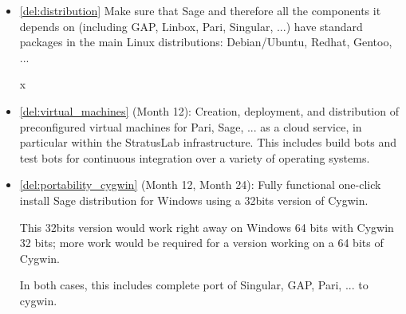 \begin{Workpackage}{\thewpno}
\begin{WPDeliverables}
\begin{itemize}


\item \ref{del:distribution} Make sure that Sage and therefore all the
  components it depends on (including GAP, Linbox, Pari, Singular,
  ...)  have standard packages in the main Linux distributions:
  Debian/Ubuntu, Redhat, Gentoo, ...


x\item \ref{del:virtual_machines} (Month 12): Creation, deployment, and
  distribution of preconfigured virtual machines for Pari, Sage,
  ... as a cloud service, in particular within the StratusLab
  infrastructure. This includes build bots and test bots for
  continuous integration over a variety of operating systems.

\item \ref{del:portability_cygwin} (Month 12, Month 24): Fully
  functional one-click install Sage distribution for Windows using a
  32bits version of Cygwin.

  This 32bits version would work right away on Windows 64 bits with
  Cygwin 32 bits; more work would be required for a version working on
  a 64 bits of Cygwin.

  In both cases, this includes complete port of Singular, GAP, Pari,
  ...  to cygwin.




\end{itemize}
\end{WPDeliverables}
\end{Workpackage}
